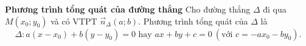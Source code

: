 	
 
\textbf{Phương trình tổng quát của đường thẳng}
	Cho đường thẳng $\Delta$ đi qua $M(x_0;y_0)$ và có VTPT $\overrightarrow{n}_{\Delta} (a;b)$. Phương trình tổng quát của $\Delta$ là 
	$$\Delta \colon a(x-x_0) +b(y-y_0) = 0 \text{ hay } ax+by+c=0 ~(\text{với } c=-ax_0-by_0).$$




